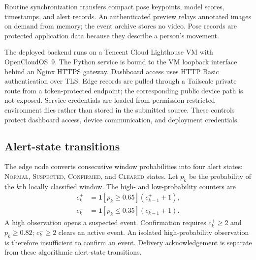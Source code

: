 Routine synchronization transfers compact pose keypoints, model scores, timestamps, and alert records. An authenticated preview relays annotated images on demand from memory; the event archive stores no video. Pose records are protected application data because they describe a person's movement.

The deployed backend runs on a Tencent Cloud Lighthouse VM with OpenCloudOS~9. The Python service is bound to the VM loopback interface behind an Nginx HTTPS gateway. Dashboard access uses HTTP Basic authentication over TLS. Edge records are pulled through a Tailscale private route from a token-protected endpoint; the corresponding public device path is not exposed. Service credentials are loaded from permission-restricted environment files rather than stored in the submitted source. These controls protect dashboard access, device communication, and deployment credentials.

\subsection{Alert-state transitions}

The edge node converts consecutive window probabilities into four alert states: \textsc{Normal}, \textsc{Suspected}, \textsc{Confirmed}, and \textsc{Cleared} states. Let $p_k$ be the probability of the $k$th locally classified window. The high- and low-probability counters are
\begin{equation}
\begin{aligned}
 c_k^+ &= \mathbf{1}[p_k\geq0.65](c_{k-1}^++1),\\
 c_k^- &= \mathbf{1}[p_k\leq0.35](c_{k-1}^-+1).
\end{aligned}
\label{eq:alert_counters}
\end{equation}
A high observation opens a suspected event. Confirmation requires $c_k^+\geq2$ and $p_k\geq0.82$; $c_k^-\geq2$ clears an active event. An isolated high-probability observation is therefore insufficient to confirm an event. Delivery acknowledgement is separate from these algorithmic alert-state transitions.
